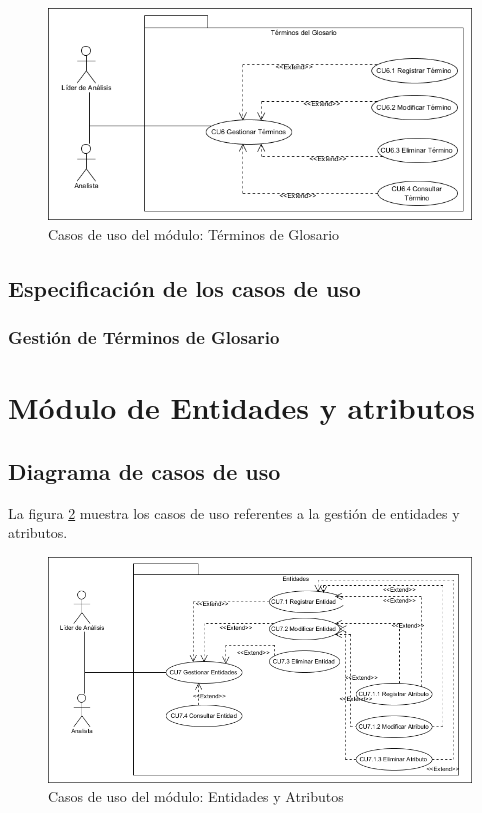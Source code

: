 \begin{figure}[H]
	\begin{center}
		\includegraphics[angle=0,width=.8\textwidth]{images/Diagramas/moduloGLS}
		\caption{Casos de uso del módulo: Términos de Glosario}
		\label{fig:moduloLiderGLS}
	\end{center}
\end{figure}
\newpage

\subsection{Especificación de los casos de uso}
\subsubsection{Gestión de Términos de Glosario}


\newpage

\section{Módulo de Entidades y atributos}
\subsection{Diagrama de casos de uso}

La figura \ref{fig:moduloLiderEA} muestra los casos de uso referentes a la gestión de entidades y atributos.

\begin{figure}[H]
	\begin{center}
		\includegraphics[angle=0,width=.8\textwidth]{images/Diagramas/moduloEntidades}
		\caption{Casos de uso del módulo: Entidades y Atributos}
		\label{fig:moduloLiderEA}
	\end{center}
\end{figure}
\newpage

